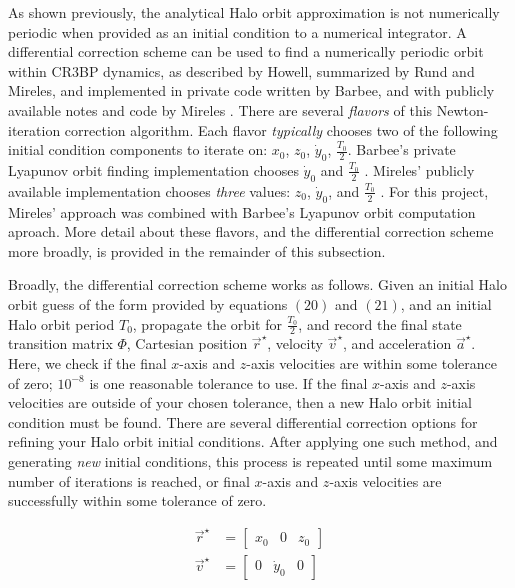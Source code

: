 \documentclass[conf]{new-aiaa}
\begin{document}
\begin{multicols*}{2}
As shown previously, the analytical Halo orbit approximation is 
not numerically periodic when provided as an initial condition
to a numerical integrator. A differential correction scheme can 
be used to find a numerically periodic orbit within CR3BP dynamics, 
as described by Howell, summarized by Rund and Mireles, 
and implemented in private code written by Barbee, and
with publicly available notes and code by Mireles 
\cite{howell1984three} 
\cite{rund2018interplanetary}
\cite{barbeeCode}
\cite{mirelesNotes}
\cite{mirelesCode}.
There are several \textit{flavors} of this Newton-iteration correction algorithm. 
Each flavor \textit{typically} chooses two of the following initial condition
components to iterate on: $x_0$, $z_0$, $\dot{y}_0$, $\frac{T_0}{2}$.
Barbee's private Lyapunov orbit finding implementation chooses 
$\dot{y}_0$ and $\frac{T_0}{2}$ \cite{barbeeCode}.
Mireles' publicly available implementation chooses \textit{three} 
values: $z_0$, $\dot{y}_0$, and $\frac{T_0}{2}$ \cite{mirelesCode}. 
For this project, Mireles'
approach was combined with Barbee's Lyapunov orbit computation aproach. 
More detail about these flavors, and the differential
correction scheme more broadly, is provided in the remainder of this subsection. 

Broadly, the differential correction scheme works as follows.
Given an initial Halo orbit guess of the form provided by equations 
$\left(20\right)$ and $\left(21\right)$, and an initial Halo orbit
period $T_0$, propagate the orbit for $\frac{T_0}{2}$, and record
the final state transition matrix $\Phi$, 
Cartesian position $\overrightarrow{r}^{\star}$, 
velocity $\overrightarrow{v}^{\star}$, and acceleration
$\overrightarrow{a}^{\star}$. Here, we check if 
the final $x$-axis and $z$-axis velocities are within some tolerance of zero; 
$10^{-8}$ is one reasonable tolerance to use. If the final $x$-axis and $z$-axis
velocities are outside of your chosen tolerance, then a new Halo orbit
initial condition must be found. There are several differential correction 
options for refining your Halo orbit initial conditions. After 
applying one such method, and generating \textit{new} initial conditions, 
this process is repeated until some maximum number of iterations 
is reached, or final $x$-axis and $z$-axis velocities are successfully
within some tolerance of zero. 

\begin{align}
    \overrightarrow{r}^{\star} &= \begin{bmatrix} x_0 & 0 & z_0 \end{bmatrix} \\
    \overrightarrow{v}^{\star} &= \begin{bmatrix} 0 & \dot{y}_0 & 0 \end{bmatrix}
\end{align}


\end{multicols*}
\end{document}
